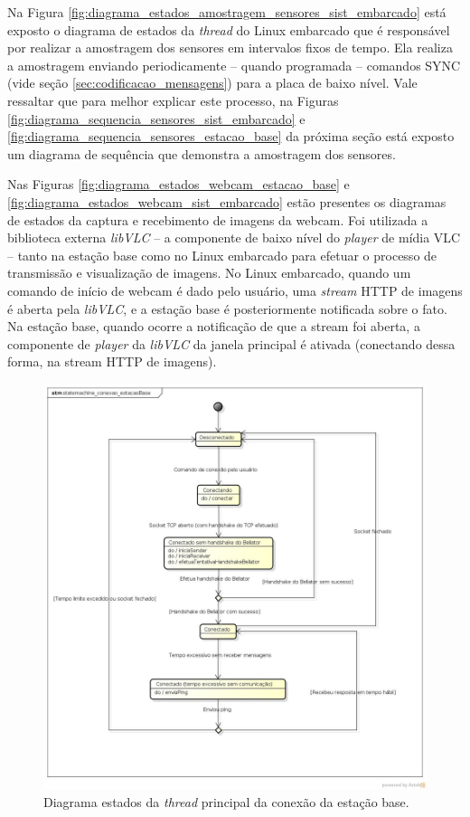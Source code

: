 Na Figura \ref{fig:diagrama_estados_amostragem_sensores_sist_embarcado} está exposto o diagrama de estados da \textit{thread} do Linux embarcado que é responsável por realizar a amostragem dos sensores em intervalos fixos de tempo. Ela realiza a amostragem enviando periodicamente -- quando programada -- comandos SYNC (vide seção \ref{sec:codificacao_mensagens}) para a placa de baixo nível. Vale ressaltar que para melhor explicar este processo, na Figuras \ref{fig:diagrama_sequencia_sensores_sist_embarcado} e \ref{fig:diagrama_sequencia_sensores_estacao_base} da próxima seção está exposto um diagrama de sequência que demonstra a amostragem dos sensores.

Nas Figuras \ref{fig:diagrama_estados_webcam_estacao_base} e \ref{fig:diagrama_estados_webcam_sist_embarcado} estão presentes os diagramas de estados da captura e recebimento de imagens da webcam. Foi utilizada a biblioteca externa \textit{libVLC} \cite{vlc} -- a componente de baixo nível do \textit{player} de mídia VLC -- tanto na estação base como no Linux embarcado para efetuar o processo de transmissão e visualização de imagens. No Linux embarcado, quando um comando de início de webcam é dado pelo usuário, uma \textit{stream} HTTP de imagens é aberta pela \textit{libVLC}, e a estação base é posteriormente notificada sobre o fato. Na estação base, quando ocorre a notificação de que a stream foi aberta, a componente de \textit{player} da \textit{libVLC} da janela principal é ativada (conectando dessa forma, na stream HTTP de imagens).



\begin{figure}[H]
  \centering
  \includegraphics[width=\textwidth, keepaspectratio]{./figuras/estacaoBase/statemachine_conexao_estacaoBase.jpg}
  \caption{Diagrama estados da \textit{thread} principal da conexão da estação base.}
  \label{fig:diagrama_estados_estacao_base}
\end{figure}

